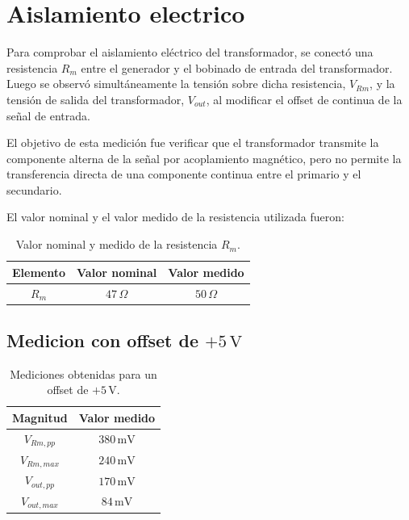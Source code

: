 \section{Aislamiento electrico}

Para comprobar el aislamiento el\'ectrico del transformador, se conect\'o una
resistencia \(R_m\) entre el generador y el bobinado de entrada del
transformador. Luego se observ\'o simult\'aneamente la tensi\'on sobre dicha
resistencia, \(V_{Rm}\), y la tensi\'on de salida del transformador, \(V_{out}\),
al modificar el offset de continua de la se\~nal de entrada.

El objetivo de esta medici\'on fue verificar que el transformador transmite la
componente alterna de la se\~nal por acoplamiento magn\'etico, pero no permite
la transferencia directa de una componente continua entre el primario y el
secundario.

El valor nominal y el valor medido de la resistencia utilizada fueron:

\begin{table}[H]
\centering
\begin{tabular}{|c|c|c|}
\hline
Elemento & Valor nominal & Valor medido \\
\hline
\(R_m\) & \(47\,\Omega\) & \(50\,\Omega\) \\
\hline
\end{tabular}
\caption{Valor nominal y medido de la resistencia \(R_m\).}
\end{table}

\subsection{Medicion con offset de \(+5\,\mathrm{V}\)}

\begin{table}[H]
\centering
\begin{tabular}{|c|c|}
\hline
Magnitud & Valor medido \\
\hline
\(V_{Rm,pp}\) & \(380\,\mathrm{mV}\) \\
\hline
\(V_{Rm,max}\) & \(240\,\mathrm{mV}\) \\
\hline
\(V_{out,pp}\) & \(170\,\mathrm{mV}\) \\
\hline
\(V_{out,max}\) & \(84\,\mathrm{mV}\) \\
\hline
\end{tabular}
\caption{Mediciones obtenidas para un offset de \(+5\,\mathrm{V}\).}
\end{table}

